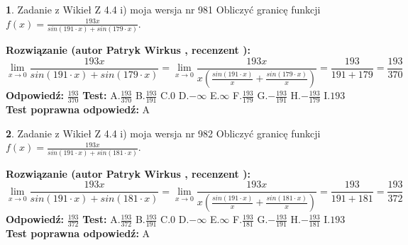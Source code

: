 \documentclass[12pt, a4paper]{article}
\theoremstyle{definition} %
\newtheorem{zad}{}
\newcommand{\zadStart}[1]{\begin{zad}#1\newline}
\newcommand{\zadStop}{\end{zad}}
\newcommand{\rozwStart}[2]{\noindent \textbf{Rozwiązanie (autor #1 , recenzent #2): }\newline}
\newcommand{\rozwStop}{\newline}
\newcommand{\odpStart}{\noindent \textbf{Odpowiedź:}\newline}
\newcommand{\odpStop}{\newline}
\newcommand{\testStart}{\noindent \textbf{Test:}\newline}
\newcommand{\testStop}{\newline}
\newcommand{\kluczStart}{\noindent \textbf{Test poprawna odpowiedź:}\newline}
\newcommand{\kluczStop}{\newline}
\begin{document}
\zadStart{Zadanie z Wikieł Z 4.4 i) moja wersja nr 981}
Obliczyć granicę funkcji $f(x)=\frac{193x}{sin(191\cdot x) +sin(179\cdot x)}$.
\zadStop
\rozwStart{Patryk Wirkus}{}
$$\lim\limits_{x\to 0}\frac{193x}{sin(191\cdot x) +sin(179\cdot x)}=\lim\limits_{x\to 0}\frac{193x}{x(\frac{sin(191\cdot x)}{x}+\frac{sin(179\cdot x)}{x})}=\frac{193}{191+179} = \frac{193}{370}$$
\rozwStop
\odpStart
$\frac{193}{370}$
\odpStop
\testStart
A.$\frac{193}{370}$
B.$\frac{193}{191}$
C.$0$
D.$-\infty$
E.$\infty$
F.$\frac{193}{179}$
G.$-\frac{193}{191}$
H.$-\frac{193}{179}$
I.$193$
\testStop
\kluczStart
A
\kluczStop



\zadStart{Zadanie z Wikieł Z 4.4 i) moja wersja nr 982}
Obliczyć granicę funkcji $f(x)=\frac{193x}{sin(191\cdot x) +sin(181\cdot x)}$.
\zadStop
\rozwStart{Patryk Wirkus}{}
$$\lim\limits_{x\to 0}\frac{193x}{sin(191\cdot x) +sin(181\cdot x)}=\lim\limits_{x\to 0}\frac{193x}{x(\frac{sin(191\cdot x)}{x}+\frac{sin(181\cdot x)}{x})}=\frac{193}{191+181} = \frac{193}{372}$$
\rozwStop
\odpStart
$\frac{193}{372}$
\odpStop
\testStart
A.$\frac{193}{372}$
B.$\frac{193}{191}$
C.$0$
D.$-\infty$
E.$\infty$
F.$\frac{193}{181}$
G.$-\frac{193}{191}$
H.$-\frac{193}{181}$
I.$193$
\testStop
\kluczStart
A
\kluczStop
\end{document}

